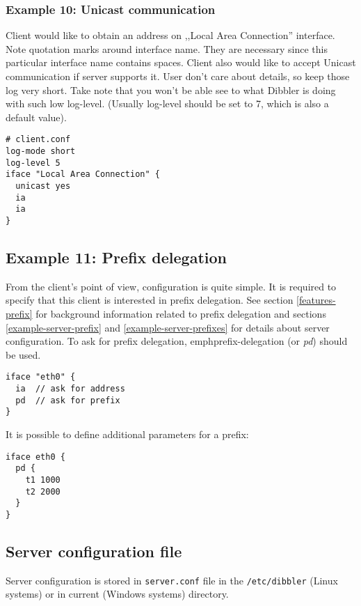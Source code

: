\subsubsection{Example 10: Unicast communication}

Client would like to obtain an address on ,,Local Area Connection''
interface. Note quotation marks around
interface name. They are necessary since this particular interface name
contains spaces. Client also would like to accept Unicast
communication if server supports it. User don't care about
details, so keep those log very short. Take note that you won't be
able see to what Dibbler is doing with such low log-level. (Usually
log-level should be set to 7, which is also a default value).

\begin{lstlisting}
# client.conf
log-mode short
log-level 5
iface "Local Area Connection" {
  unicast yes
  ia
  ia
}
\end{lstlisting}

\subsection{Example 11: Prefix delegation}
\label{example-client-prefix}
From the client's point of view, configuration is quite simple. It is
required to specify that this client is interested in prefix
delegation. See section \ref{features-prefix} for background
information related to prefix delegation and sections
\ref{example-server-prefix} and \ref{example-server-prefixes} for
details about server configuration. To ask for prefix delegation, 
emph{prefix-delegation} (or \emph{pd}) should be used.

\begin{lstlisting}
iface "eth0" {
  ia  // ask for address
  pd  // ask for prefix
}
\end{lstlisting}

It is possible to define additional parameters for a prefix:

\begin{lstlisting}
iface eth0 {
  pd {
    t1 1000
    t2 2000
  }
}
\end{lstlisting}

\subsection{Server configuration file}

Server configuration is stored in \verb+server.conf+ file in the
\verb+/etc/dibbler+ (Linux systems) or in current (Windows systems)
directory. 

